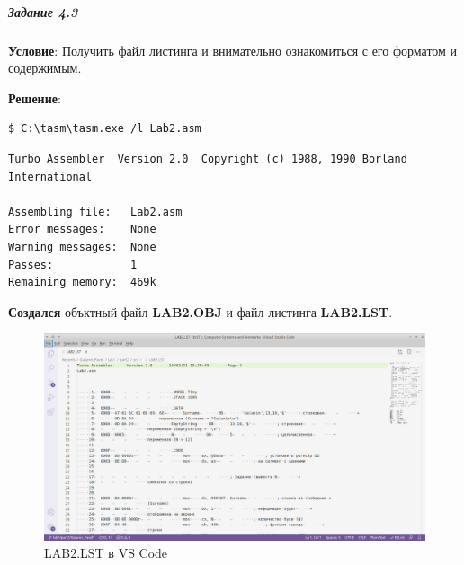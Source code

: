 \subparagraph{Задание 4.3}

\textbf{Условие}:
Получить файл листинга и внимательно ознакомиться с его форматом и содержимым.

\textbf{Решение}:

\begin{lstlisting}[language=Terminal]
$ C:\tasm\tasm.exe /l Lab2.asm
\end{lstlisting}

\begin{lstlisting}[language=Out]
Turbo Assembler  Version 2.0  Copyright (c) 1988, 1990 Borland International

Assembling file:   Lab2.asm
Error messages:    None
Warning messages:  None
Passes:            1
Remaining memory:  469k
\end{lstlisting}

\textbf{Создался} объктный файл \textbf{LAB2.OBJ} и файл листинга \textbf{LAB2.LST}.

\begin{figure}[h]
    \centering
    \includegraphics[width=18cm]
        {../_INCLUDES/task-4-3/LAB2.LST.png}
    \caption{LAB2.LST в VS Code}
\end{figure}
